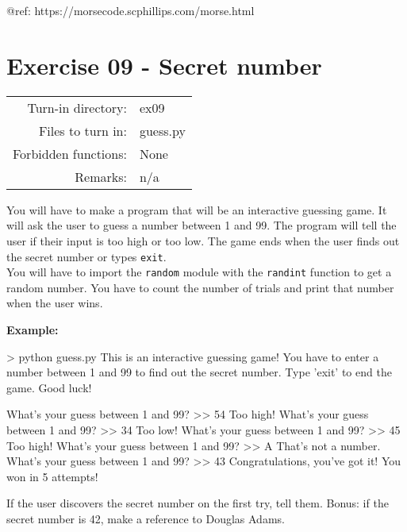 \documentclass[]{article}
\newenvironment{Shaded}{\begin{snugshade}}{\end{snugshade}}
\newcommand{\NormalTok}[1]{\textcolor[rgb]{0.81,0.81,0.76}{#1}}
\begin{document}
@ref: https://morsecode.scphillips.com/morse.html

\clearpage

\hypertarget{exercise-09---secret-number-1}{%
\section{Exercise 09 - Secret
number}\label{exercise-09---secret-number-1}}

\begin{longtable}[]{@{}rl@{}}
\toprule
\endhead
Turn-in directory: & ex09\tabularnewline
Files to turn in: & guess.py\tabularnewline
Forbidden functions: & None\tabularnewline
Remarks: & n/a\tabularnewline
\bottomrule
\end{longtable}

You will have to make a program that will be an interactive guessing
game. It will ask the user to guess a number between 1 and 99. The
program will tell the user if their input is too high or too low. The
game ends when the user finds out the secret number or types
\texttt{exit}.\\
You will have to import the \texttt{random} module with the
\texttt{randint} function to get a random number. You have to count the
number of trials and print that number when the user wins.

\textbf{Example:}

\begin{Shaded}
\begin{Highlighting}[]
\NormalTok{> python guess.py}
\NormalTok{This is an interactive guessing game!}
\NormalTok{You have to enter a number between 1 and 99 to find out the secret number.}
\NormalTok{Type 'exit' to end the game.}
\NormalTok{Good luck!}

\NormalTok{What's your guess between 1 and 99?}
\NormalTok{>> 54}
\NormalTok{Too high!}
\NormalTok{What's your guess between 1 and 99?}
\NormalTok{>> 34}
\NormalTok{Too low!}
\NormalTok{What's your guess between 1 and 99?}
\NormalTok{>> 45}
\NormalTok{Too high!}
\NormalTok{What's your guess between 1 and 99?}
\NormalTok{>> A}
\NormalTok{That's not a number.}
\NormalTok{What's your guess between 1 and 99?}
\NormalTok{>> 43}
\NormalTok{Congratulations, you've got it!}
\NormalTok{You won in 5 attempts!}
\end{Highlighting}
\end{Shaded}

If the user discovers the secret number on the first try, tell them.
Bonus: if the secret number is 42, make a reference to Douglas Adams.
\end{document}
